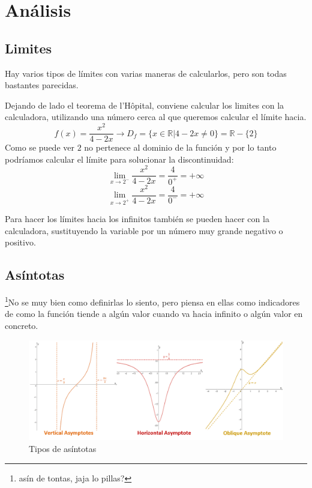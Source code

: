 \documentclass[arial,a4paper,print]{article}
\begin{document}
\pagebreak
\section{Análisis}

\subsection{Limites}
Hay varios tipos de límites con varias maneras de calcularlos, pero son todas bastantes parecidas. 

Dejando de lado el teorema de l'Hôpital, conviene calcular los limites con la calculadora, utilizando una número cerca al que queremos calcular el límite hacia. 
\begin{equation*}
	f(x) = \frac{x^{2}}{4-2x} \rightarrow D_{f} = \{x \in \mathbb{R} | 4-2x\neq 0 \} = \mathbb{R} - \{2\}
\end{equation*}
Como se puede ver $2$ no pertenece al dominio de la función y por lo tanto podríamos calcular el límite para solucionar la discontinuidad:
\begin{equation*}
	\lim_{x\rightarrow2^{-}} \frac{x^{2}}{4-2x} = \frac{4}{0^{+}} = + \infty
\end{equation*}
\begin{equation*}
	\lim_{x\rightarrow2^{+}} \frac{x^{2}}{4-2x} = \frac{4}{0^{-}} = + \infty
\end{equation*}

Para hacer los límites hacia los infinitos también se pueden hacer con la calculadora, sustituyendo la variable por un número muy grande negativo o positivo. 

\subsection{Asíntotas}
\footnote{asín de tontas, jaja lo pillas?}No se muy bien como definirlas lo siento, pero piensa en ellas como indicadores de como la función tiende a algún valor cuando va hacia infinito o algún valor en concreto. 

\begin{figure}[H]
	\centering
	\includegraphics[width=0.7\linewidth]{figures/asymptotes}
	\caption{Tipos de asíntotas}
	\label{fig:asymptotes}
\end{figure}
\end{document}
